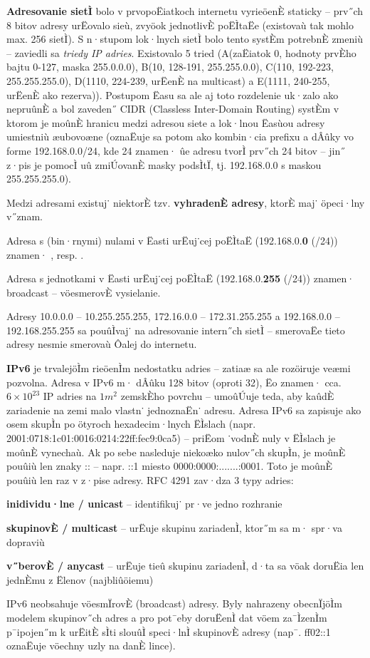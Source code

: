 \textbf{Adresovanie sietÌ} bolo v prvopoËiatkoch internetu vyrieöenÈ staticky -- prv˝ch 8 bitov adresy urËovalo sieù, zvyöok jednotlivÈ poËÌtaËe (existovaù tak mohlo max. 256 sietÌ). S n·stupom lok·lnych sietÌ bolo tento systÈm potrebnÈ zmeniù -- zaviedli sa \emph{triedy IP adries}. Existovalo 5 tried (A(zaËiatok 0, hodnoty prvÈho bajtu 0-127, maska 255.0.0.0), B(10, 128-191, 255.255.0.0), C(110, 192-223, 255.255.255.0), D(1110, 224-239, urËenÈ na multicast) a E(1111, 240-255, urËenÈ ako rezerva)). Postupom Ëasu sa ale aj toto rozdelenie uk·zalo ako nepruûnÈ a bol zaveden˝ CIDR (Classless Inter-Domain Routing) systÈm v ktorom je moûnÈ hranicu medzi adresou siete a lok·lnou Ëasùou adresy umiestniù æubovoæne (oznaËuje sa potom ako kombin·cia prefixu a dÂûky vo forme 192.168.0.0/24, kde 24 znamen· ûe adresu tvorÌ prv˝ch 24 bitov -- jin˝ z·pis je pomocÌ uû zmiÚovanÈ masky podsÌtÏ, tj. 192.168.0.0 s maskou 255.255.255.0).

Medzi adresami existuj˙ niektorÈ tzv. \textbf{vyhradenÈ adresy}, ktorÈ maj˙ öpeci·lny v˝znam.
\begin{pitemize}
	\item Adresa s (bin·rnymi) nulami v Ëasti urËuj˙cej poËÌtaË (192.168.0.\textbf{0} (/24)) znamen· , resp. .
	\item Adresa s jednotkami v Ëasti urËuj˙cej poËÌtaË (192.168.0.\textbf{255} (/24)) znamen· broadcast -- vöesmerovÈ vysielanie.
	\item Adresy 10.0.0.0 -- 10.255.255.255, 172.16.0.0 -- 172.31.255.255 a 192.168.0.0 -- 192.168.255.255 sa pouûÌvaj˙ na adresovanie intern˝ch sietÌ -- smerovaËe tieto adresy nesmie smerovaù Ôalej do internetu.
\end{pitemize}

\textbf{IPv6} je trvalejöÌm rieöenÌm nedostatku adries -- zatiaæ sa ale rozöiruje veæmi pozvolna. Adresa v IPv6 m· dÂûku 128 bitov (oproti 32), Ëo znamen· cca. $6 \times 10^{23}$ IP adries na $1 m^2$ zemskÈho povrchu -- umoûÚuje teda, aby kaûdÈ zariadenie na zemi malo vlastn˙ jednoznaËn˙ adresu. Adresa IPv6 sa zapisuje ako osem skupÌn po ötyroch hexadecim·lnych ËÌslach (napr. 2001:0718:1c01:0016:0214:22ff:fec9:0ca5) -- priËom ˙vodnÈ nuly v ËÌslach je moûnÈ vynechaù. Ak po sebe nasleduje niekoæko nulov˝ch skupÌn, je moûnÈ pouûiù len znaky :: -- napr. ::1 miesto 0000:0000:.......:0001. Toto je moûnÈ pouûiù len raz v z·pise adresy. RFC 4291 zav·dza 3 typy adries:
\begin{pitemize}
	\item \textbf{inidividu·lne / unicast} -- identifikuj˙ pr·ve jedno rozhranie
	\item \textbf{skupinovÈ / multicast} -- urËuje skupinu zariadenÌ, ktor˝m sa m· spr·va dopraviù
	\item \textbf{v˝berovÈ / anycast} -- urËuje tieû skupinu zariadenÌ, d·ta sa vöak doruËia len jednÈmu z Ëlenov (najbliûöiemu)
\end{pitemize}
IPv6 neobsahuje vöesmÏrovÈ (broadcast) adresy. Byly nahrazeny obecnÏjöÌm modelem skupinov˝ch adres a pro pot¯eby doruËenÌ dat vöem za¯ÌzenÌm p¯ipojen˝m k urËitÈ sÌti slouûÌ speci·lnÌ skupinovÈ adresy (nap¯. ff02::1 oznaËuje vöechny uzly na danÈ lince).

